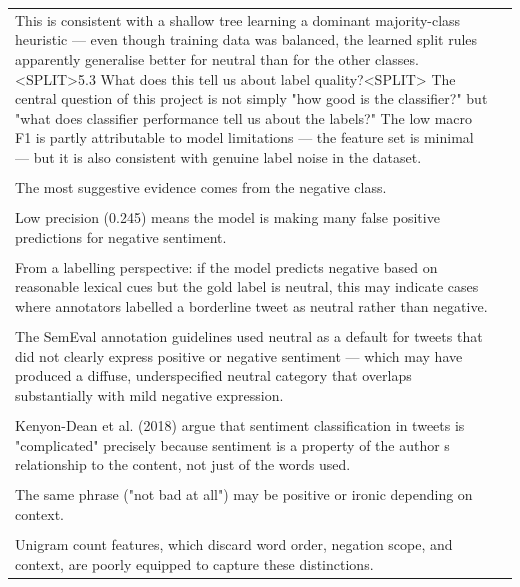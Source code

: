 \documentclass[11pt]{article}
\begin{document}
\begin{longtable}{|p{}|p{}|}
\hline
\rule{0pt}{3.5cm} & \\
\hline
This is consistent with a shallow tree learning a dominant majority-class heuristic --- even though training data was balanced, the learned split rules apparently generalise better for neutral than for the other classes. <SPLIT>5.3 What does this tell us about label quality?<SPLIT> The central question of this project is not simply "how good is the classifier?" but "what does classifier performance tell us about the labels?" The low macro F1 is partly attributable to model limitations --- the feature set is minimal --- but it is also consistent with genuine label noise in the dataset. & \\[2pt]
\hline
\rule{0pt}{3.5cm} & \\
\hline
The most suggestive evidence comes from the negative class. & \\[2pt]
\hline
\rule{0pt}{3.5cm} & \\
\hline
Low precision (0.245) means the model is making many false positive predictions for negative sentiment. & \\[2pt]
\hline
\rule{0pt}{3.5cm} & \\
\hline
From a labelling perspective: if the model predicts negative based on reasonable lexical cues but the gold label is neutral, this may indicate cases where annotators labelled a borderline tweet as neutral rather than negative. & \\[2pt]
\hline
\rule{0pt}{3.5cm} & \\
\hline
The SemEval annotation guidelines used neutral as a default for tweets that did not clearly express positive or negative sentiment --- which may have produced a diffuse, underspecified neutral category that overlaps substantially with mild negative expression. & \\[2pt]
\hline
\rule{0pt}{3.5cm} & \\
\hline
Kenyon-Dean et al. (2018) argue that sentiment classification in tweets is "complicated" precisely because sentiment is a property of the author s relationship to the content, not just of the words used. & \\[2pt]
\hline
\rule{0pt}{3.5cm} & \\
\hline
The same phrase ("not bad at all") may be positive or ironic depending on context. & \\[2pt]
\hline
\rule{0pt}{3.5cm} & \\
\hline
Unigram count features, which discard word order, negation scope, and context, are poorly equipped to capture these distinctions. & \\[2pt]

\end{longtable}
\end{document}
